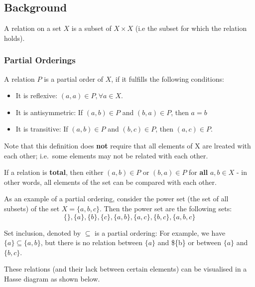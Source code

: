 

\subsection{Background}\label{background}

A relation on a set \(X\) is a subset of \(X \times X\) (i.e the subset
for which the relation holds).

\subsubsection{Partial Orderings}\label{partial-orderings}

A relation \(P\) is a partial order of \(X\), if it fulfills the
following conditions:

\begin{itemize}
\item
  It is reflexive: \((a,a) \in P, \forall a \in X\).
\item
  It is antisymmetric: If \((a,b) \in P\) and \((b,a) \in P\), then
  \(a=b\)
\item
  It is transitive: If \((a,b) \in P\) and \((b,c) \in P\), then
  \((a,c) \in P\).
\end{itemize}

Note that this definition does \textbf{not} require that all elements of
X are lreated with each other; i.e.~some elements may not be related
with each other.

If a relation is \textbf{total}, then either \((a,b) \in P\) or
\((b,a) \in P\) for \textbf{all} \(a,b \in X\) - in other words, all
elements of the set can be compared with each other.

As an example of a partial ordering, consider the power set (the set of
all subsets) of the set \(X=\{a,b,c\}\). Then the power set are the
following sets: \[
\{\}, \{a\}, \{b\},\{c\}, \{a,b\}, \{a,c\}, \{b,c\}, \{a,b,c\}
\]

Set inclusion, denoted by \(\subseteq\) is a partial ordering: For
example, we have \(\{a\} \subseteq \{a,b\}\), but there is no relation
between \(\{a\}\) and \$\{b\} or between \(\{a\}\) and \(\{b,c\}\).

These relations (and their lack between certain elements) can be
visualised in a Hasse diagram as shown below.

